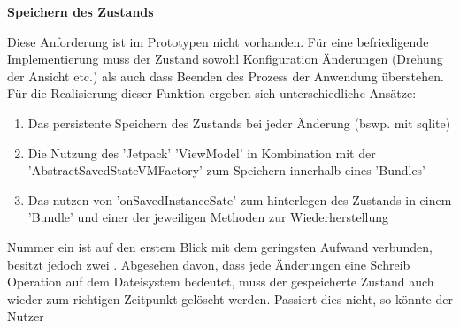 \textbf{Speichern des Zustands}
\begin{addmargin}[1em]{0em}
	Diese Anforderung ist im Prototypen nicht vorhanden. Für eine befriedigende Implementierung muss der Zustand sowohl Konfiguration Änderungen (Drehung der Ansicht etc.) als auch dass Beenden des Prozess der Anwendung überstehen. Für die Realisierung dieser Funktion ergeben sich unterschiedliche Ansätze:
	\begin{enumerate}
		\item Das persistente Speichern des Zustands bei jeder Änderung (bswp. mit sqlite)
		\item Die Nutzung des 'Jetpack' 'ViewModel' in Kombination mit der 'AbstractSavedStateVMFactory'
		zum Speichern innerhalb eines 'Bundles'
		\item Das nutzen von 'onSavedInstanceSate' zum hinterlegen des Zustands in einem 'Bundle'  und einer der jeweiligen Methoden zur Wiederherstellung
	\end{enumerate}
	Nummer ein ist auf den erstem Blick mit dem geringsten Aufwand verbunden, besitzt jedoch zwei . Abgesehen davon, dass jede Änderungen eine Schreib Operation auf dem Dateisystem bedeutet, muss der gespeicherte Zustand auch wieder zum richtigen Zeitpunkt gelöscht werden. Passiert dies nicht, so könnte der Nutzer 
\end{addmargin}